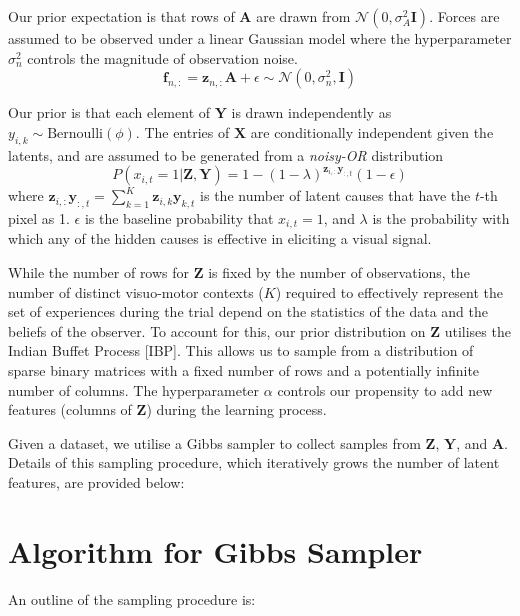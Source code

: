\documentclass[]{article}
\begin{document}
Our prior expectation is that rows of $\mathbf{A}$ are drawn from $\mathcal{N}(0, \sigma^2_A \mathbf{I})$. Forces are assumed to be observed under a linear Gaussian model where the hyperparameter $\sigma^2_n$ controls the magnitude of observation noise. 
\begin{equation*}
	\mathbf{f}_{n,:} = \mathbf{z}_{n,:}\mathbf{A} + \epsilon \sim \mathcal{N}(0, \sigma^2_n, \mathbf{I})
\end{equation*}

Our prior is that each element of $\mathbf{Y}$ is drawn independently as $y_{i,k} \sim \text{Bernoulli}(\phi)$. The entries of $\mathbf{X}$ are conditionally independent given the latents, and are assumed to be generated from a \textit{noisy-OR} distribution
\begin{equation*}
	P(x_{i,t} = 1 | \mathbf{Z}, \mathbf{Y}) = 1 - (1-\lambda)^{\mathbf{z}_{i,:}\mathbf{y}_{:,t}}(1-\epsilon)
\end{equation*}
where $\mathbf{z}_{i,:}\mathbf{y}_{:,t} = \sum_{k=1}^{K} \mathbf{z}_{i,k}\mathbf{y}_{k,t}$ is the number of latent causes that have the $t$-th pixel as 1. $\epsilon$ is the baseline probability that $x_{i,t} = 1$, and $\lambda$ is the probability with which any of the hidden causes is effective in eliciting a visual signal. 

While the number of rows for $\mathbf{Z}$ is fixed by the number of observations, the number of distinct visuo-motor contexts ($K$) required to effectively represent the set of experiences during the trial depend on the statistics of the data and the beliefs of the observer. To account for this, our prior distribution on $\mathbf{Z}$ utilises the Indian Buffet Process [IBP]. This allows us to sample from a distribution of sparse binary matrices with a fixed number of rows and a potentially infinite number of columns. The hyperparameter $\alpha$ controls our propensity to add new features (columns of $\mathbf{Z}$) during the learning process.

Given a dataset, we utilise a Gibbs sampler to collect samples from $\mathbf{Z}$, $\mathbf{Y}$, and $\mathbf{A}$. Details of this sampling procedure, which iteratively grows the number of latent features, are provided below:

\newpage
\section{Algorithm for Gibbs Sampler}
An outline of the sampling procedure is:
\end{document}
